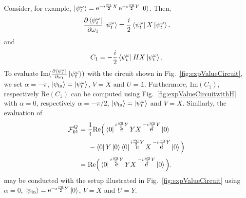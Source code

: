 \documentclass[twocolumn, aps, pra, superscriptaddress]{revtex4-1}
\DeclareMathOperator{\ee}{e}
\begin{document}
Consider, for example, $\ket{\psi^{\omega}_t} = \textstyle{\ee^{-i\frac{\omega_1}{2}X}\ee^{-i\frac{\omega_0}{2}Y}\ket{0}}$. 
Then,
\begin{align}
\frac{\partial \bra{\psi^{\omega}_t}}{\partial \omega_1}\ket{\psi^{\omega}_t} = \frac{i}{2}\bra{\psi^{\omega}_t} X\ket{\psi^{\omega}_t}.
\end{align}
and
\begin{align}
    C_1= -\frac{i}{2}\bra{\psi^{\omega}_t} HX\ket{\psi^{\omega}_t}.
\end{align}
To evaluate $\text{Im}(\textstyle{\frac{\partial \bra{\psi^{\omega}_t}}{\partial \omega_1}\ket{\psi^{\omega}_t}})$ with the circuit shown in Fig.~\ref{fig:expValueCircuit}, we set $\alpha=-\pi$, $\ket{\psi_{\text{in}}}=\ket{\psi^{\omega}_t}$, $V=X$ and $U=\mathds{1}$. Furthermore, $\text{Im}\left(C_1\right)$, respectively $\text{Re}\left(C_1\right)$ can be computed using Fig.~\ref{fig:expValueCircuitwithH} with $\alpha=0$, respectively $\alpha=-\pi/2$, $\ket{\psi_{\text{in}}}=\ket{\psi^{\omega}_t}$ and $V=X$.
Similarly, the evaluation of
\begin{align}
    \mathcal{F}^Q_{01} &= \frac{1}{4}
\text{Re}\Big(\bra{0}\ee^{i\frac{\omega_0}{2}Y}Y X\ee^{-i\frac{\omega_0}{2}Y}\ket{0} \nonumber \\
&\hspace{5mm}- \bra{0}Y\ket{0}\bra{0}\ee^{i\frac{\omega_0}{2}Y}X\ee^{-i\frac{\omega_0}{2}Y}\ket{0}\Big)\nonumber \\
&=\text{Re}\Big(\bra{0}\ee^{i\frac{\omega_0}{2}Y}Y X\ee^{-i\frac{\omega_0}{2}Y}\ket{0}\Big).
\end{align}
may be conducted with the setup illustrated in Fig.~\ref{fig:expValueCircuit} using $\alpha=0$, $\ket{\psi_{\text{in}}} = \textstyle{\ee^{-i\frac{\omega_0}{2}Y}\ket{0}}$, $V=X$ and $U=Y$.
\end{document}
